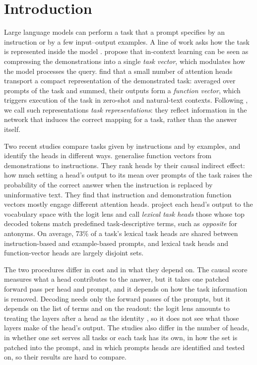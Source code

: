 \documentclass[10pt,a4paper]{article}
\begin{document}
\section{Introduction}\label{sec:intro}

Large language models can perform a task that a prompt specifies by an instruction or by a few input--output examples. A line of work asks how the task is represented inside the model \citep{hendel2023incontext,todd2024function,davidson2025different,yang2026shared}. \citet{hendel2023incontext} propose that in-context learning can be seen as compressing the demonstrations into a single \emph{task vector}, which modulates how the model processes the query. \citet{todd2024function} find that a small number of attention heads transport a compact representation of the demonstrated task: averaged over prompts of the task and summed, their outputs form a \emph{function vector}, which triggers execution of the task in zero-shot and natural-text contexts. Following \citet{davidson2025different}, we call such representations \emph{task representations}: they reflect information in the network that induces the correct mapping for a task, rather than the answer itself.

Two recent studies compare tasks given by instructions and by examples, and identify the heads in different ways. \citet{davidson2025different} generalise function vectors from demonstrations to instructions. They rank heads by their causal indirect effect: how much setting a head's output to its mean over prompts of the task raises the probability of the correct answer when the instruction is replaced by uninformative text. They find that instruction and demonstration function vectors mostly engage different attention heads. \citet{yang2026shared} project each head's output to the vocabulary space with the logit lens and call \emph{lexical task heads} those whose top decoded tokens match predefined task-descriptive terms, such as \emph{opposite} for antonyms. On average, 73\% of a task's lexical task heads are shared between instruction-based and example-based prompts, and lexical task heads and function-vector heads are largely disjoint sets.

The two procedures differ in cost and in what they depend on. The causal score measures what a head contributes to the answer, but it takes one patched forward pass per head and prompt, and it depends on how the task information is removed. Decoding needs only the forward passes of the prompts, but it depends on the list of terms and on the readout: the logit lens amounts to treating the layers after a head as the identity \citep{gurnee2026workspace}, so it does not see what those layers make of the head's output. The studies also differ in the number of heads, in whether one set serves all tasks or each task has its own, in how the set is patched into the prompt, and in which prompts heads are identified and tested on, so their results are hard to compare.
\end{document}
